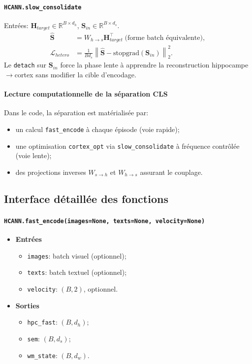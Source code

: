 \documentclass[12pt,a4paper]{article}
\begin{document}
\paragraph{\texttt{HCANN.slow\_consolidate}}
Entrées: $\mathbf{H}_{target}\in\mathbb{R}^{B\times d_h}$, $\mathbf{S}_{in}\in\mathbb{R}^{B\times d_s}$.
\begin{align}
\hat{\mathbf{S}} &= W_{h\to s}\mathbf{H}_{target}^\top \; \text{(forme batch équivalente)},\\
\mathcal{L}_{hetero} &= \frac{1}{B d_s}\left\|\hat{\mathbf{S}}-\mathrm{stopgrad}(\mathbf{S}_{in})\right\|_2^2.
\end{align}
Le \texttt{detach} sur $\mathbf{S}_{in}$ force la phase lente à apprendre la reconstruction hippocampe$\rightarrow$cortex sans modifier la cible d'encodage.

\paragraph{Lecture computationnelle de la séparation CLS}
Dans le code, la séparation est matérialisée par:
\begin{itemize}
    \item un calcul \texttt{fast\_encode} à chaque épisode (voie rapide);
    \item une optimisation \texttt{cortex\_opt} via \texttt{slow\_consolidate} à fréquence contrôlée (voie lente);
    \item des projections inverses $W_{s\to h}$ et $W_{h\to s}$ assurant le couplage.
\end{itemize}

\subsection{Interface détaillée des fonctions}

\paragraph{\texttt{HCANN.fast\_encode(images=None, texts=None, velocity=None)}}
\begin{itemize}[leftmargin=*]
    \item \textbf{Entrées}
    \begin{itemize}
        \item \texttt{images}: batch visuel (optionnel);
        \item \texttt{texts}: batch textuel (optionnel);
        \item \texttt{velocity}: $(B,2)$, optionnel.
    \end{itemize}
    \item \textbf{Sorties}
    \begin{itemize}
        \item \texttt{hpc\_fast}: $(B,d_h)$;
        \item \texttt{sem}: $(B,d_s)$;
        \item \texttt{wm\_state}: $(B,d_w)$.
    \end{itemize}
\end{itemize}
\end{document}
